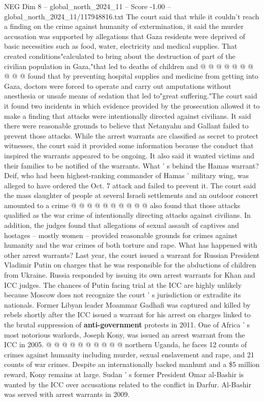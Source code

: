 \begin{textsample}{NEG Dim 8 – global\_north\_2024\_11 – Score -1.00 – global\_north\_2024\_11/117948816.txt}
The court said that while it couldn't reach a finding on the crime against humanity of extermination, it said the murder accusation was supported by allegations that Gaza residents were deprived of basic necessities such as food, water, electricity and medical supplies.
That created conditions"calculated to bring about the destruction of part of the civilian population in Gaza,"that led to deaths of children and @ @ @ @ @ @ @ @ @ @ found that by preventing hospital supplies and medicine from getting into Gaza, doctors were forced to operate and carry out amputations without anesthesia or unsafe means of sedation that led to"great suffering."The court said it found two incidents in which evidence provided by the prosecution allowed it to make a finding that attacks were intentionally directed against civilians.
It said there were reasonable grounds to believe that Netanyahu and Gallant failed to prevent those attacks.
While the arrest warrants are classified as secret to protect witnesses, the court said it provided some information because the conduct that inspired the warrants appeared to be ongoing.
It also said it wanted victims and their families to be notified of the warrants.
What ' s behind the Hamas warrant?
Deif, who had been highest-ranking commander of Hamas ' military wing, was alleged to have ordered the Oct. 7 attack and failed to prevent it.
The court said the mass slaughter of people at several Israeli settlements and an outdoor concert amounted to a crime @ @ @ @ @ @ @ @ @ @ also found that those attacks qualified as the war crime of intentionally directing attacks against civilians.
In addition, the judges found that allegations of sexual assault of captives and hostages -- mostly women -- provided reasonable grounds for crimes against humanity and the war crimes of both torture and rape.
What has happened with other arrest warrants?
Last year, the court issued a warrant for Russian President Vladimir Putin on charges that he was responsible for the abductions of children from Ukraine.
Russia responded by issuing its own arrest warrants for Khan and ICC judges.
The chances of Putin facing trial at the ICC are highly unlikely because Moscow does not recognize the court ' s jurisdiction or extradite its nationals.
Former Libyan leader Moammar Gadhafi was captured and killed by rebels shortly after the ICC issued a warrant for his arrest on charges linked to the brutal suppression of \textbf{anti-government} protests in 2011.
One of Africa ' s most notorious warlords, Joseph Kony, was issued an arrest warrant from the ICC in 2005. @ @ @ @ @ @ @ @ @ @ northern Uganda, he faces 12 counts of crimes against humanity including murder, sexual enslavement and rape, and 21 counts of war crimes.
Despite an internationally backed manhunt and a \$5 million reward, Kony remains at large.
Sudan ' s former President Omar al-Bashir is wanted by the ICC over accusations related to the conflict in Darfur.
Al-Bashir was served with arrest warrants in 2009.

\end{textsample}
